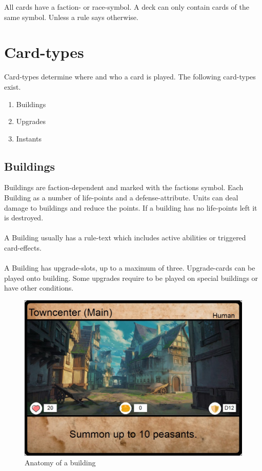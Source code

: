 \documentclass[a5paper,pagesize,10pt,bibtotoc,pointlessnumbers,
normalheadings,DIV=9,twoside=false]{scrbook}
\begin{document}
All cards have a faction- or race-symbol. A deck can only contain cards of the same symbol. Unless a rule says otherwise.

\section{Card-types}
Card-types determine where and who a card is played. The following card-types exist.

\begin{enumerate}
\item Buildings
\item Upgrades
\item Instants
\end{enumerate}

\subsection{Buildings}
Buildings are faction-dependent and marked with the factions symbol. Each Building as a number of life-points and a defense-attribute.
Units can deal damage to buildings and reduce the points. If a building has no life-points left it is destroyed.\\
\\
A Building usually has a rule-text which includes active abilities or triggered card-effects.\\
\\
A Building has upgrade-slots, up to a maximum of three.
Upgrade-cards can be played onto building. Some upgrades require to be played on special buildings or have other conditions.

\begin{figure}[t]
\includegraphics[scale=1.0]{examplebuilding}
\centering
\caption{Anatomy of a building}
\end{figure}
\end{document}
